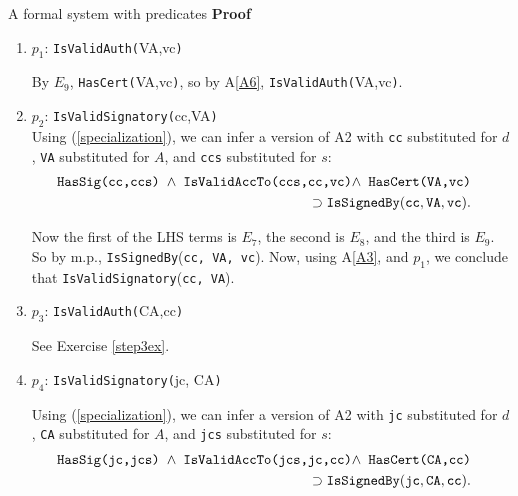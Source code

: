 \begin{example}{A formal system with predicates}
{\bf Proof}
\begin{enumerate}[1.]
		\item{}\label{step1}
$p_1$: {\tt IsValidAuth(}VA,vc{\tt )}

By $E_9$, {\tt HasCert(}VA,vc{\tt )}, so by A\ref{A6},
{\tt IsValidAuth(}VA,vc{\tt )}. 

\item{}\label{step2} 
$p_2$: {\tt IsValidSignatory(}cc,VA{\tt )}\\[5mm]

Using (\ref{specialization}), we can infer a version of A2 with {\tt cc} substituted for $d$,
{\tt VA} substituted for $A$, and {\tt ccs} substituted for $s$:
\begin{eqnarray}\label{A1a}\nonumber
&&\hspace{-7mm}\hbox{\tt HasSig(cc,ccs) $\wedge$ IsValidAccTo(ccs,cc,vc)$\wedge$ HasCert(VA,vc)} \\
		&&\hspace{-7mm}\nonumber
\supset \hbox{\tt IsSignedBy}({\tt cc, VA, vc}).
\end{eqnarray}

Now the first of the LHS terms is $E_7$, the second is $E_8$, and the third is $E_{9}$.
So by m.p., {\tt IsSignedBy}({\tt cc, VA, vc}). Now, using A\ref{A3}, and $p_1$, we conclude
that \hbox{\tt IsValidSignatory}({\tt cc, VA}).


\item{}\label{step3} 
$p_3$: {\tt IsValidAuth(}CA,cc{\tt )}
\iffalse

By $E_7$: {{\tt HasSig(cc,ccs)}};
$E_8$: {{\tt IsValidAccTo(ccs,cc,vc)}};
and $p_2$: {\tt IsValidSignatory(}cc,VA,vc{\tt )};
and A\ref{A1}, {\tt IsValidCert(}CA,cc{\tt )}. 

By $E_6$, {\tt HasCert(}CA,cc{\tt )}, so by A\ref{A4},
{\tt IsValidAuth(}CA,cc{\tt )}. 
\else
See Exercise \ref{step3ex}.
\fi

\item{}\label{step4} 
$p_4$: {\tt IsValidSignatory(}jc, CA{\tt )}
\iffalse

Using (\ref{specialization}), we can infer a version of A2 with {\tt jc} substituted for $d$,
{\tt CA} substituted for $A$, and {\tt jcs} substituted for $s$:
\begin{eqnarray}\label{A1a}\nonumber
&&\hspace{-7mm}\hbox{\tt HasSig(jc,jcs) $\wedge$ IsValidAccTo(jcs,jc,cc)$\wedge$ HasCert(CA,cc)} \\
		&&\hspace{-7mm}\nonumber
\supset \hbox{\tt IsSignedBy}({\tt jc, CA, cc}).
\end{eqnarray}


\end{enumerate}
\end{example}
